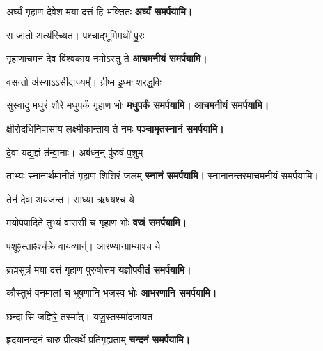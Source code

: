 \begin{center}
{अर्घ्यं गृहाण देवेश मया दत्तं हि भक्तितः}
\textbf{\devAya{} अर्घ्यं समर्पयामि।}

{स जा॒तो अत्य॑रिच्यत। प॒श्चाद्भूमि॒मथो॑ पु॒रः}

{गृहाणाचमनं देव विश्वकाय नमोऽस्तु ते}
\textbf{\devAya{} आचमनीयं समर्पयामि।}
\medskip


{व॒स॒न्तो अ॑स्याऽऽसी॒दाज्यम्᳚। ग्री॒ष्म इ॒ध्मः श॒रद्ध॒विः}

{सुस्वादु मधुरं शौरे मधुपर्कं गृहाण भोः}
\textbf{\devAya{} मधुपर्कं समर्पयामि।}
\textbf{\devAya{} आचमनीयं समर्पयामि।}
\medskip


{क्षीरोदधिनिवासाय लक्ष्मीकान्ताय ते नमः}
\textbf{\devAya{} पञ्चामृतस्नानं समर्पयामि।}
\medskip

{दे॒वा यद्य॒ज्ञं त॑न्वा॒नाः। अब॑ध्न॒न् पु॑रुषं प॒शुम्}

{ताभ्यः स्नानार्थमानीतं गृहाण शिशिरं जलम्}
\textbf{\devAya{} स्नानं समर्पयामि।}
स्नानानन्तरमाचमनीयं समर्पयामि।
\medskip

{तेन॑ दे॒वा अय॑जन्त। सा॒ध्या ऋष॑यश्च॒ ये}

{मयोपपादिते तुभ्यं वाससी च गृहाण भोः}
\textbf{\devAya{} वस्रं समर्पयामि।}
\medskip

{प॒शूꣴस्ताꣴश्च॑क्रे वाय॒व्यान्॑। आ॒र॒ण्यान्ग्रा॒म्याश्च॒ ये}

{ब्रह्मसूत्रं मया दत्तं गृहाण पुरुषोत्तम}
\textbf{\devAya{} यज्ञोपवीतं समर्पयामि। }
\medskip

{कौस्तुभं वनमालां च भूषणानि भजस्व भोः}
\textbf{\devAya{} आभरणानि समर्पयामि।} 
\medskip

{छन्दासि जज्ञिरे॒ तस्मा᳚त्। यजु॒स्तस्मा॑दजायत}

{हृदयानन्दनं चारु प्रीत्यर्थे प्रतिगृह्यताम्}
\textbf{\devAya{} चन्दनं समर्पयामि।}
\medskip


\end{center}
